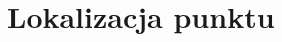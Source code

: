 \documentclass[11pt,oneside,brudnopis]{xelatex-mgr/xmgr}
\begin{document}
\section{Lokalizacja punktu}




% 
% 



\end{document}
